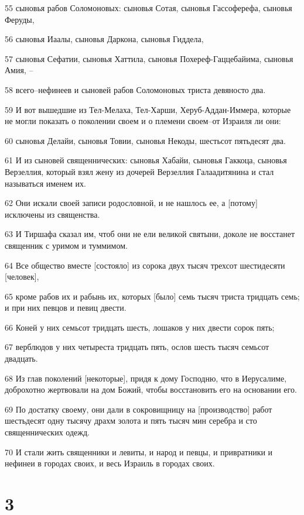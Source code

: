 \par 55 сыновья рабов Соломоновых: сыновья Сотая, сыновья Гассоферефа, сыновья Феруды,
\par 56 сыновья Иаалы, сыновья Даркона, сыновья Гиддела,
\par 57 сыновья Сефатии, сыновья Хаттила, сыновья Похереф-Гаццебайима, сыновья Амия, --
\par 58 всего--нефинеев и сыновей рабов Соломоновых триста девяносто два.
\par 59 И вот вышедшие из Тел-Мелаха, Тел-Харши, Херуб-Аддан-Иммера, которые не могли показать о поколении своем и о племени своем--от Израиля ли они:
\par 60 сыновья Делайи, сыновья Товии, сыновья Некоды, шестьсот пятьдесят два.
\par 61 И из сыновей священнических: сыновья Хабайи, сыновья Гаккоца, сыновья Верзеллия, который взял жену из дочерей Верзеллия Галаадитянина и стал называться именем их.
\par 62 Они искали своей записи родословной, и не нашлось ее, а [потому] исключены из священства.
\par 63 И Тиршафа сказал им, чтоб они не ели великой святыни, доколе не восстанет священник с уримом и туммимом.
\par 64 Все общество вместе [состояло] из сорока двух тысяч трехсот шестидесяти [человек],
\par 65 кроме рабов их и рабынь их, которых [было] семь тысяч триста тридцать семь; и при них певцов и певиц двести.
\par 66 Коней у них семьсот тридцать шесть, лошаков у них двести сорок пять;
\par 67 верблюдов у них четыреста тридцать пять, ослов шесть тысяч семьсот двадцать.
\par 68 Из глав поколений [некоторые], придя к дому Господню, что в Иерусалиме, доброхотно жертвовали на дом Божий, чтобы восстановить его на основании его.
\par 69 По достатку своему, они дали в сокровищницу на [производство] работ шестьдесят одну тысячу драхм золота и пять тысяч мин серебра и сто священнических одежд.
\par 70 И стали жить священники и левиты, и народ и певцы, и привратники и нефинеи в городах своих, и весь Израиль в городах своих.

\chapter{3}

